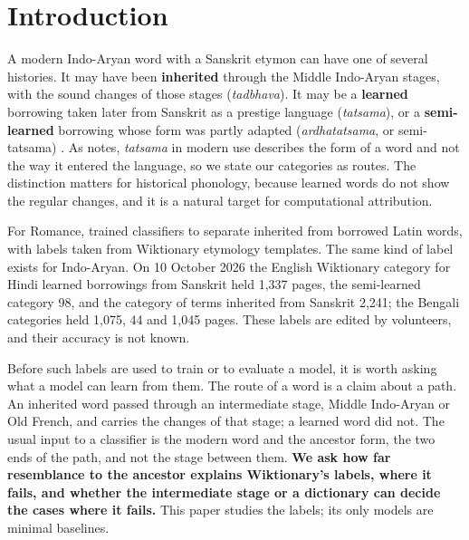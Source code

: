 \documentclass[11pt]{article}
\begin{document}
\section{Introduction}

A modern Indo-Aryan word with a Sanskrit etymon can have one of several histories. It may have been \textbf{inherited} through the Middle Indo-Aryan stages, with the sound changes of those stages (\textit{tadbhava}). It may be a \textbf{learned} borrowing taken later from Sanskrit as a prestige language (\textit{tatsama}), or a \textbf{semi-learned} borrowing whose form was partly adapted (\textit{ardhatatsama}, or semi-tatsama) \citep[\S111]{chatterji1926}. As \citeauthor{chatterji1926} notes, \textit{tatsama} in modern use describes the form of a word and not the way it entered the language, so we state our categories as routes. The distinction matters for historical phonology, because learned words do not show the regular changes, and it is a natural target for computational attribution.

For Romance, \citet{cristea2021inherited} trained classifiers to separate inherited from borrowed Latin words, with labels taken from Wiktionary etymology templates. The same kind of label exists for Indo-Aryan. On 10 October 2026 the English Wiktionary category for Hindi learned borrowings from Sanskrit held 1,337 pages, the semi-learned category 98, and the category of terms inherited from Sanskrit 2,241; the Bengali categories held 1,075, 44 and 1,045 pages. These labels are edited by volunteers, and their accuracy is not known.

Before such labels are used to train or to evaluate a model, it is worth asking what a model can learn from them. The route of a word is a claim about a path. An inherited word passed through an intermediate stage, Middle Indo-Aryan or Old French, and carries the changes of that stage; a learned word did not. The usual input to a classifier is the modern word and the ancestor form, the two ends of the path, and not the stage between them. \textbf{We ask how far resemblance to the ancestor explains Wiktionary's labels, where it fails, and whether the intermediate stage or a dictionary can decide the cases where it fails.} This paper studies the labels; its only models are minimal baselines.
\end{document}
